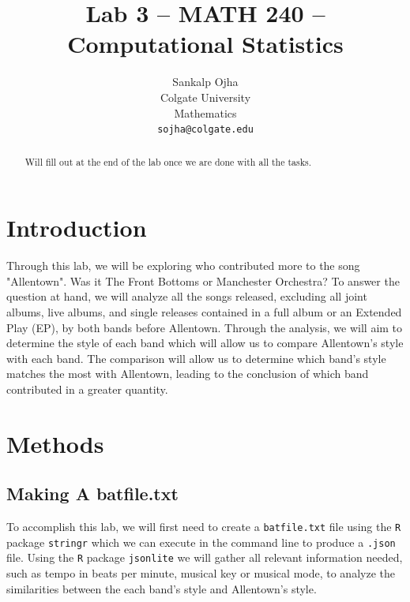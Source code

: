 \documentclass{article}\usepackage[]{graphicx}\usepackage[]{xcolor}
\begin{document}
\vspace{-1in}
\title{Lab 3 -- MATH 240 -- Computational Statistics}

\author{
  Sankalp Ojha \\
  Colgate University  \\
  Mathematics  \\
  {\tt sojha@colgate.edu}
}

\date{}

\maketitle

\begin{multicols}{2}
\begin{abstract}
Will fill out at the end of the lab once we are done with all the tasks.
\end{abstract}

\section{Introduction}
Through this lab, we will be exploring who contributed more to the song "Allentown". Was it The Front Bottoms or Manchester Orchestra? To answer the question at hand, we will analyze all the songs released, excluding all joint albums, live albums, and single releases contained in a full album or an Extended Play (EP), by both bands before Allentown. Through the analysis, we will aim to determine the style of each band which will allow us to compare Allentown's style with each band. The comparison will allow us to determine which band's style matches the most with Allentown, leading to the conclusion of which band contributed in a greater quantity.

\section{Methods}

\subsection{Making A batfile.txt}
To accomplish this lab, we will first need to create a \texttt{batfile.txt} file using the \texttt{R} package \texttt{stringr} \citep{stringr} which we can execute in the command line to produce a \texttt{.json} file. Using the \texttt{R} package \texttt{jsonlite} \citep{jsonlite} we will gather all relevant information needed, such as tempo in beats per minute, musical key or musical mode, to analyze the similarities between the each band's style and Allentown's style. 


\end{multicols}
\end{document}

